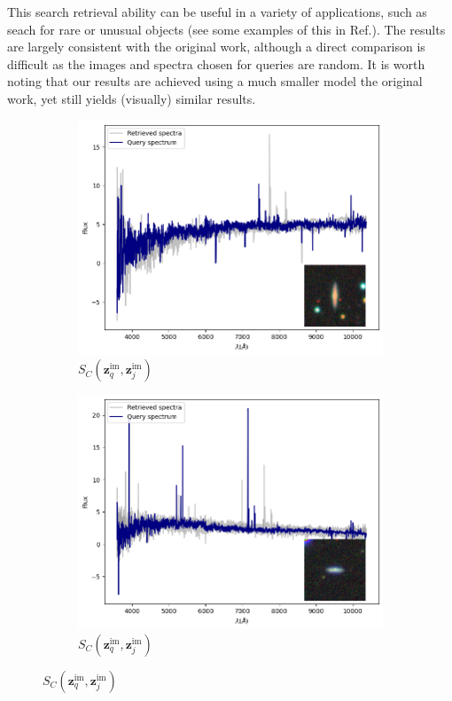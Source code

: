 \documentclass[draft, a4paper,12pt]{article}
\begin{document}
This search retrieval ability can be useful in a variety of applications, such as seach for rare or unusual objects (see some examples of this in Ref.\cite{stein}). The results are largely consistent with the original work, although a direct comparison is difficult as the images and spectra chosen for queries are random. It is worth noting that our results are achieved using a much smaller model the original work, yet still yields (visually) similar results.
\begin{figure}[H]
    \centering
    \vspace*{-1.3cm}

    \begin{subfigure}[b]{0.45\textwidth}
        \centering
        \includegraphics[width=\textwidth]{../figures/spectral_retrieval_im_im_1}
        \caption{$S_C(\mathbf{z}_q^{\text{im}}, \mathbf{z}_j^{\text{im}})$}
        \label{fig:im_im_1}
    \end{subfigure}%
    \hfill
    \begin{subfigure}[b]{0.45\textwidth}
        \centering
        \includegraphics[width=\textwidth]{../figures/spectral_retrieval_im_im_2}
        \caption{$S_C(\mathbf{z}_q^{\text{im}}, \mathbf{z}_j^{\text{im}})$}
        \label{fig:im_im_2}
    \end{subfigure}


\end{figure}
\end{document}
